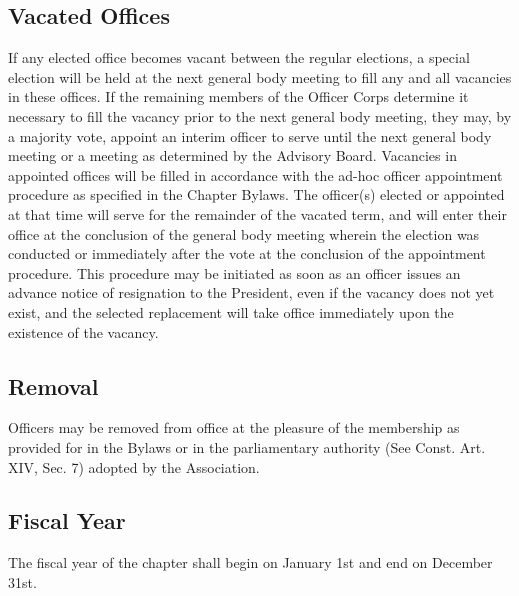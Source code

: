 \subsection{Vacated Offices} \label{III.6}
If any elected office becomes vacant between the regular elections, a special election will be held at the next general body meeting to fill any and all vacancies in these offices.
If the remaining members of the Officer Corps determine it necessary to fill the vacancy prior to the next general body meeting, they may, by a majority vote, appoint an interim officer to serve until the next general body meeting or a meeting as determined by the Advisory Board.
Vacancies in appointed offices will be filled in accordance with the ad-hoc officer appointment procedure as specified in the Chapter Bylaws.
The officer(s) elected or appointed at that time will serve for the remainder of the vacated term, and will enter their office at the conclusion of the general body meeting wherein the election was conducted or immediately after the vote at the conclusion of the appointment procedure.
This procedure may be initiated as soon as an officer issues an advance notice of resignation to the President, even if the vacancy does not yet exist, and the selected replacement will take office immediately upon the existence of the vacancy.

\subsection{Removal} \label{III.7}
Officers may be removed from office at the pleasure of the membership as provided for in the Bylaws or in the parliamentary authority (See Const. Art. XIV, Sec. 7) adopted by the Association.

\subsection{Fiscal Year} \label{III.8}
The fiscal year of the chapter shall begin on January 1st and end on December 31st.
